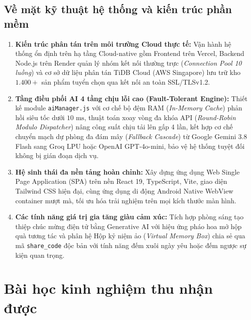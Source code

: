 \subsection{Về mặt kỹ thuật hệ thống và kiến trúc phần mềm}
\begin{enumerate}
    \item \textbf{Kiến trúc phân tán trên môi trường Cloud thực tế:} Vận hành hệ thống ổn định trên hạ tầng Cloud-native gồm Frontend trên Vercel, Backend Node.js trên Render quản lý nhóm kết nối thường trực (\textit{Connection Pool 10 luồng}) và cơ sở dữ liệu phân tán TiDB Cloud (AWS Singapore) lưu trữ kho $1.400+$ sản phẩm tuyển chọn qua kết nối an toàn SSL/TLSv1.2.
    \item \textbf{Tầng điều phối AI 4 tầng chịu lỗi cao (Fault-Tolerant Engine):} Thiết kế module \texttt{aiManager.js} với cơ chế bộ đệm RAM (\textit{In-Memory Cache}) phản hồi siêu tốc dưới $10\text{ ms}$, thuật toán xoay vòng đa khóa API (\textit{Round-Robin Modulo Dispatcher}) nâng công suất chịu tải lên gấp 4 lần, kết hợp cơ chế chuyển mạch dự phòng đa đám mây (\textit{Fallback Cascade}) từ Google Gemini 3.8 Flash sang Groq LPU hoặc OpenAI GPT-4o-mini, bảo vệ hệ thống tuyệt đối không bị gián đoạn dịch vụ.
    \item \textbf{Hệ sinh thái đa nền tảng hoàn chỉnh:} Xây dựng ứng dụng Web Single Page Application (SPA) trên nền React 19, TypeScript, Vite, giao diện Tailwind CSS hiện đại, cùng ứng dụng di động Android Native WebView container mượt mà, tối ưu hóa trải nghiệm trên mọi kích thước màn hình.
    \item \textbf{Các tính năng giá trị gia tăng giàu cảm xúc:} Tích hợp phòng sáng tạo thiệp chúc mừng điện tử bằng Generative AI với hiệu ứng pháo hoa mở hộp quà tương tác và phân hệ Hộp kỷ niệm ảo (\textit{Virtual Memory Box}) chia sẻ qua mã \texttt{share\_code} độc bản với tính năng đếm xuôi ngày yêu hoặc đếm ngược sự kiện quan trọng.
\end{enumerate}

\section{Bài học kinh nghiệm thu nhận được}

